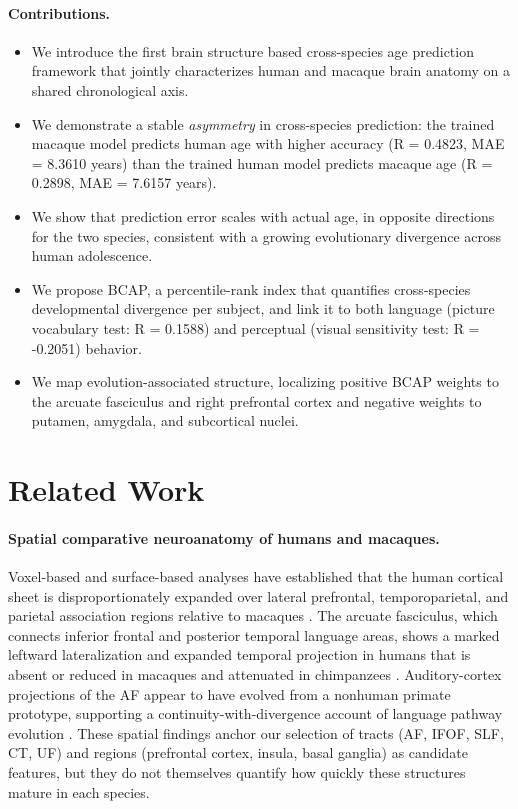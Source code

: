 \paragraph{Contributions.}
\begin{itemize}
  \item We introduce the first brain structure based cross-species age prediction framework that jointly characterizes human and macaque brain anatomy on a shared chronological axis.
  \item We demonstrate a stable \textit{asymmetry} in cross-species prediction: the trained macaque model predicts human age with higher accuracy (R = 0.4823, MAE = 8.3610 years) than the trained human model predicts macaque age (R = 0.2898, MAE = 7.6157 years).
  \item We show that prediction error scales with actual age, in opposite directions for the two species, consistent with a growing evolutionary divergence across human adolescence.
  \item We propose BCAP, a percentile-rank index that quantifies cross-species developmental divergence per subject, and link it to both language (picture vocabulary test: R = 0.1588) and perceptual (visual sensitivity test: R = -0.2051) behavior.
  \item We map evolution-associated structure, localizing positive BCAP weights to the arcuate fasciculus and right prefrontal cortex and negative weights to putamen, amygdala, and subcortical nuclei.
\end{itemize}

\section{Related Work}

\paragraph{Spatial comparative neuroanatomy of humans and macaques.}
Voxel-based and surface-based analyses have established that the human cortical sheet is disproportionately expanded over lateral prefrontal, temporoparietal, and parietal association regions relative to macaques \cite{hill2010similar, smaers2011primate, smaers2019brain}. The arcuate fasciculus, which connects inferior frontal and posterior temporal language areas, shows a marked leftward lateralization and expanded temporal projection in humans that is absent or reduced in macaques and attenuated in chimpanzees \cite{rilling2008evolution, rilling2012continuity, eichert2019special}. Auditory-cortex projections of the AF appear to have evolved from a nonhuman primate prototype, supporting a continuity-with-divergence account of language pathway evolution \cite{balezeau2020primate, catani2008arcuate, rocchi2021common}. These spatial findings anchor our selection of tracts (AF, IFOF, SLF, CT, UF) and regions (prefrontal cortex, insula, basal ganglia) as candidate features, but they do not themselves quantify how quickly these structures mature in each species.

